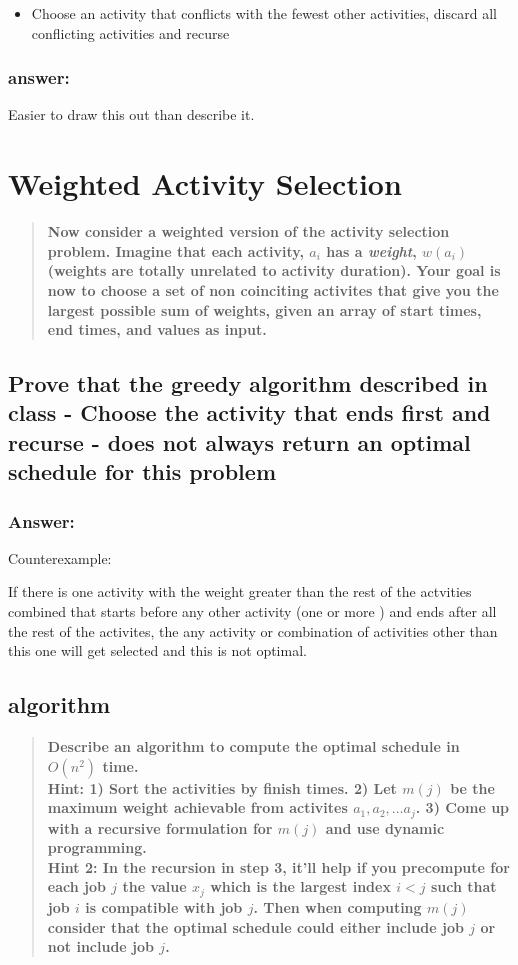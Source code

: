 \documentclass[titlepage]{article}\usepackage[]{graphicx}\usepackage[]{color}
\begin{document}
\begin{itemize}
  \item Choose an activity that conflicts with the fewest other activities,
	  discard all conflicting activities and recurse
\end{itemize}
\subsubsection{answer:}
Easier to draw this out than describe it. 
\vspace{9 cm}

\section{Weighted Activity Selection}
\begin{quote}
  \textbf{ Now consider a weighted version of the activity selection problem. Imagine
	that each activity, $a_i$ has a \textit{weight}, $w(a_i)$ (weights are
	totally unrelated to activity duration). Your goal is now to choose a set of
	non coinciting activites that give you the largest possible sum of weights,
  given an array of start times, end times, and values as input.}
\end{quote}

\subsection{Prove that the greedy algorithm described in class - Choose the
  activity that ends first and recurse - does not always return an optimal
schedule for this problem}
\subsubsection{Answer: }
Counterexample:

If there is one activity with the weight greater than the rest of the actvities
combined that starts before any other activity (one or more ) and ends after
all the rest of the activites, the any activity or combination of activities
other than this one will get selected and this is not optimal.

\subsection{algorithm}
  
\begin{quote}
  
  \textbf{Describe an algorithm to compute the optimal schedule in $O(n^2)$
  time. \\
  Hint: 1) Sort the activities by finish times. 2) Let $m(j)$ be the
  maximum weight achievable from activites $a_1, a_2, \dots a_j$. 3) Come up
  with a recursive formulation for $m(j)$ and use dynamic programming. \\
  Hint 2:
  In the recursion in step 3, it'll help if you precompute for each job $j$ the
  value $x_j$ which is the largest index $i < j$ such that job $i$ is
  compatible with job $j$. Then when computing $m(j)$ consider that the optimal
schedule could either include job $j$ or not include job $j$.}
\end{quote}
\end{document}
